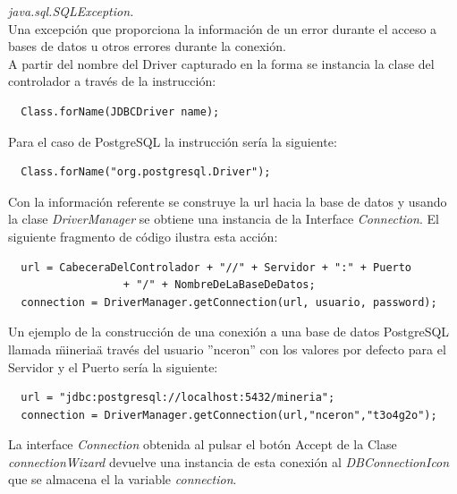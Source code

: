 \textit{java.sql.SQLException.\\}
Una excepci\'on que proporciona la informaci\'on de un error durante el acceso a bases de datos u otros errores
durante la conexi\'on.\\

A partir del nombre del Driver capturado en la forma se instancia la clase del controlador a trav\'es de la
instrucci\'on:

\begin{verbatim}
  Class.forName(JDBCDriver name);
\end{verbatim}

Para el caso de PostgreSQL la instrucci\'on ser\'ia la siguiente:

\begin{verbatim}
  Class.forName("org.postgresql.Driver");
\end{verbatim}

Con la informaci\'on referente se construye la url hacia la base de datos y usando la clase
\textit{DriverManager} se obtiene una instancia de la Interface \textit{Connection}.  El siguiente fragmento de
c\'odigo ilustra esta acci\'on:

\begin{verbatim}
  url = CabeceraDelControlador + "//" + Servidor + ":" + Puerto 
                  + "/" + NombreDeLaBaseDeDatos;
  connection = DriverManager.getConnection(url, usuario, password);
\end{verbatim}

Un ejemplo de la construcci\'on de una conexi\'on a una base de datos PostgreSQL llamada \"mineria\" a trav\'es
del usuario ''nceron'' con los valores por defecto para el Servidor y el Puerto ser\'ia la siguiente:

\begin{verbatim}
  url = "jdbc:postgresql://localhost:5432/mineria";
  connection = DriverManager.getConnection(url,"nceron","t3o4g2o");
\end{verbatim}

La interface \textit{Connection} obtenida al pulsar el bot\'on Accept de la Clase \textit{connectionWizard}
devuelve una instancia de esta conexi\'on al \textit{DBConnectionIcon} que se almacena el la variable
\textit{connection}.\\

